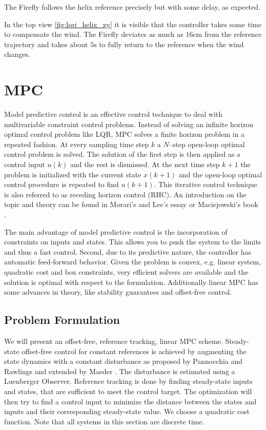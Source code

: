 The Firefly follows the helix reference precisely but with some delay, as expected.

In the top view \ref{fig:lqri_helix_xy} it is visible that the controller takes some time to compensate the wind. The Firefly deviates as much as $16 \si{\centi\metre}$ from the reference trajectory and takes about $5 \si{\second}$ to fully return to the reference when the wind changes.
\section{MPC} 
Model predictive control is an effective control technique to deal with multivariable constraint control problems. Instead of solving an infinite horizon optimal control problem like LQR, MPC solves a finite horizon problem in a repeated fashion. At every sampling time step $k$ a $N$--step open-loop optimal control problem is solved. The solution of the first step is then applied as a control input $u(k)$ and the rest is dismissed. At the next time step $k+1$ the problem is initialized with the current state $x(k+1)$ and the open-loop optimal control procedure is repeated to find $u(k+1)$. This iterative control technique is also referred to as receding horizon control (RHC). An introduction on the topic and theory can be found in Morari's and Lee's essay \cite{Morari1999} or Maciejowski's book \cite{Maciejowski2002}.

The main advantage of model predictive control is the incorporation of constraints on inputs and states. This allows you to push the system to the limits and thus a fast control. Second, due to its predictive nature, the controller has automatic feed-forward behavior. Given the problem is convex, e.g. linear system, quadratic cost and box constraints, very efficient solvers are available and the solution is optimal with respect to the formulation. Additionally linear MPC has some advances in theory, like stability guarantees and offset-free control.

\subsection{Problem Formulation}
We will present an offset-free, reference tracking, linear MPC scheme. Steady-state offset-free control for constant references is achieved by augmenting the state dynamics with a constant disturbance as proposed by Pannocchia and Rawlings and extended by Maeder \cite{Pannocchia2003a,Maeder2009}. The disturbance is estimated using a Luenberger Observer. Reference tracking is done by finding steady-state inputs and states, that are sufficient to meet the control target. The optimization will then try to find a control input to minimize the distance between the states and inputs and their corresponding steady-state value. We choose a quadratic cost function. Note that all systems in this section are discrete time. 

